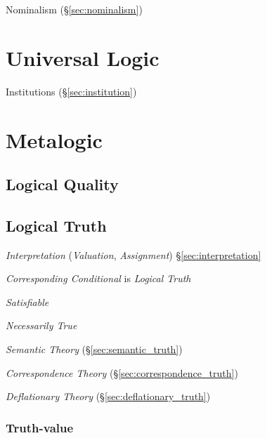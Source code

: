 Nominalism (\S\ref{sec:nominalism})



\section{Universal Logic}\label{sec:universal_logic}

Institutions (\S\ref{sec:institution})



\section{Metalogic}\label{sec:metalogic}

\subsection{Logical Quality}\label{sec:logical_quality}

\subsection{Logical Truth}\label{sec:logical_truth}

\emph{Interpretation} (\emph{Valuation}, \emph{Assignment})
\S\ref{sec:interpretation}

\emph{Corresponding Conditional} is \emph{Logical Truth}

\emph{Satisfiable}

\emph{Necessarily True}

\emph{Semantic Theory} (\S\ref{sec:semantic_truth})

\emph{Correspondence Theory} (\S\ref{sec:correspondence_truth})

\emph{Deflationary Theory} (\S\ref{sec:deflationary_truth})



\subsubsection{Truth-value}\label{sec:truth_value}

